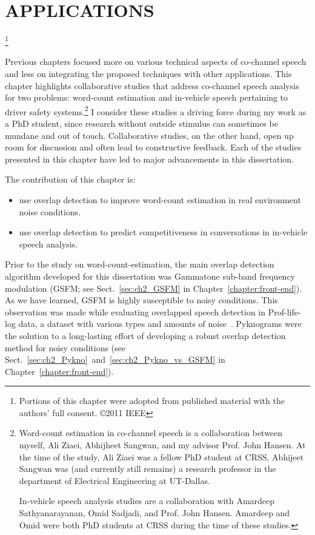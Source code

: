 \chapter{APPLICATIONS}\thanks{Portions of this chapter were adopted from published material with the authors' full consent. \copyright 2011 IEEE}
\label{chap:applications}

Previous chapters focused more on various technical aspects of co-channel speech and less on integrating the proposed techniques with other applications. 
This chapter highlights collaborative studies that address co-channel speech analysis for two problems: word-count estimation and in-vehicle speech pertaining to driver safety systems.\footnote{Word-count estimation in co-channel speech is a collaboration between myself, Ali Ziaei, Abhijheet Sangwan, and my advisor Prof. John Hansen. At the time of the study, Ali Ziaei was a fellow PhD student at CRSS, Abhijeet Sangwan was (and currently still remains) a research professor in the department of Electrical Engineering at UT-Dallas. 

In-vehicle speech analysis studies are a collaboration with Amardeep Sathyanarayanan, Omid Sadjadi, and Prof. John Hansen. Amardeep and Omid were both PhD students at CRSS during the time of these studies.} 
I consider these studies a driving force during my work as a PhD student, since research without outside stimulus can sometimes be mundane and out of touch. 
Collaborative studies, on the other hand, open up room for discussion and often lead to constructive feedback. 
Each of the studies presented in this chapter have led to major advancements in this dissertation. 

The contribution of this chapter is:
\begin{itemize}
	\item use overlap detection to improve word-count estimation in real environment noise conditions. 
	\item use overlap detection to predict competitiveness in conversations in in-vehicle speech analysis. 
\end{itemize}
Prior to the study on word-count-estimation, the main overlap detection algorithm developed for this dissertation was Gammatone sub-band frequency modulation (GSFM; see Sect.~\ref{sec:ch2_GSFM} in Chapter~\ref{chapter:front-end}). As we have learned, GSFM is highly susceptible to noisy conditions. 
This observation was made while evaluating overlapped speech detection in Prof-life-log data, a dataset with various types and amounts of noise~\cite{ziaei2013prof}. 
Pyknograms were the solution to a long-lasting effort of developing a robust overlap detection method for noisy conditions (see Sect.~\ref{sec:ch2_Pykno}~and~\ref{sec:ch2_Pykno_vs_GSFM} in Chapter~\ref{chapter:front-end}). 

